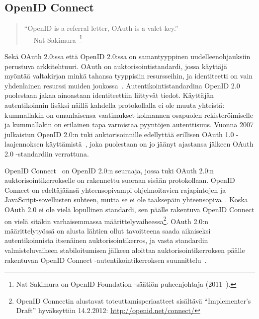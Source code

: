 \documentclass[finnish,gradu]{tktltiki}
\begin{document}


  \subsection{OpenID Connect} %
  \label{sub:openid_connect}

  \begin{quote}
    ``OpenID is a referral letter, OAuth is a valet key.''
    \\--- Nat Sakimura~\cite{sakimura_dummydiff_oauth_openid_2011}\footnote{Nat Sakimura on OpenID Foundation -säätiön puheenjohtaja (2011--).}
  \end{quote}

  Sekä OAuth 2.0:ssa että OpenID 2.0:ssa on samantyyppinen uudelleenohjauksiin perustuva arkkitehtuuri. OAuth on auktorisointistandardi, jossa käyttäjä myöntää valtakirjan minkä tahansa tyyppisiin resursseihin, ja identiteetti on vain yhdenlainen resurssi muiden joukossa~\cite{sakimura_dummydiff_oauth_openid_2011}. Autentikointistandardina OpenID 2.0 puolestaan jakaa ainoastaan identiteettiin liittyvät tiedot. Käyttäjän autentikoinnin lisäksi näillä kahdella protokollalla ei ole muuta yhteistä: kummallakin on omanlaisensa vaatimukset kolmannen osapuolen rekisteröimiselle ja kummallakin on erilainen tapa varmistaa pyyntöjen autenttisuus. Vuonna 2007 julkaistun OpenID 2.0:n tuki auktorisoinnille edellyttää erillisen OAuth 1.0 -laajennoksen käyttämistä~\cite{openid_2.0_oauth_hybrid_2009}, joka puolestaan on jo jäänyt ajastansa jälkeen OAuth 2.0 -standardiin verrattuna.

  OpenID Connect~\cite{openid_connect_specification_2012} on OpenID 2.0:n seuraaja, jossa tuki OAuth 2.0:n auktorisointikerrokselle on rakennettu suoraan sisään protokollaan. OpenID Connect on edeltäjäänsä yhteensopivampi ohjelmoitavien rajapintojen ja JavaScript-sovellusten suhteen, mutta se ei ole taaksepäin yhteensopiva~\cite{sakimura_openid_connect_scopes_2011}. Koska OAuth 2.0 ei ole vielä lopullinen standardi, sen päälle rakentuva OpenID Connect on vielä sitäkin varhaisemmassa määrittelyvaiheessa\footnote{
  OpenID Connectin alustavat toteuttamisperiaatteet sisältävä ``Implementer's Draft'' hyväksyttiin 14.2.2012: \url{http://openid.net/connect/}
  }. OAuth 2.0:n määrittelytyössä on alusta lähtien ollut tavoitteena saada aikaiseksi autentikoinnista itsenäinen auktorisointikerros, ja vasta standardin valmisteluvaiheen stabiloitumisen jälkeen aloittaa auktorisointikerroksen päälle rakentuvan OpenID Connect -autentikointikerroksen suunnittelu~\cite{recordon_oauth20_initial_2010, shepard_oauth_facebook_2010}.
\end{document}
